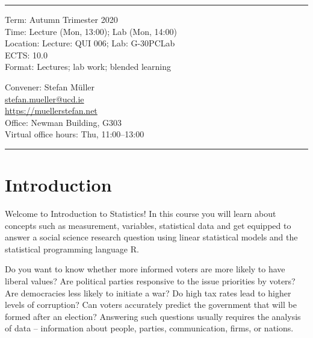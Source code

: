 \documentclass[abstract=on,parskip=full,headings=standardclasses,fontsize=11pt,paper=a4]{scrartcl}
\begin{document}
\vspace{1.5cm}



\hrule
\medskip
\begin{minipage}[t]{0.5\textwidth}
Term: Autumn Trimester 2020 \\
Time: Lecture (Mon, 13:00); Lab (Mon, 14:00) \\
Location:  Lecture: QUI 006; Lab: G-30PCLab \\
ECTS: 10.0 \\
Format: Lectures; lab work; blended learning
\end{minipage}
\begin{minipage}[t]{0.49\textwidth}
\begin{flushright}
Convener: Stefan Müller \\
 \href{mailto:stefan.mueller@ucd.ie}{\textsf{stefan.mueller@ucd.ie}} \\
 \url{https://muellerstefan.net} \\
Office:  Newman Building, G303 \\
Virtual office hours: Thu, 11:00--13:00
\end{flushright}
\end{minipage}
\medskip
\hrule 

\section*{Introduction}


Welcome to Introduction to Statistics! In this course you will learn about concepts such as measurement, variables, statistical data and get equipped to answer a social science research question using linear statistical models and the statistical programming language \textsf{R}.


Do you want to know whether more informed voters are more likely to have liberal values? Are political parties responsive to the issue priorities by voters? Are  democracies less likely to initiate a war? Do high tax rates lead to higher levels of corruption? Can voters accurately predict the government that will be formed after an election? Answering such questions usually requires the analysis of data  
-- information about people, parties, communication, firms, or nations. %
\end{document}
